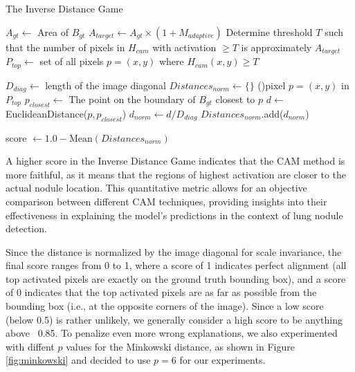 \begin{algorithm}[H]
    \caption{The Inverse Distance Game}
    \label{alg:distance-game}
    \DontPrintSemicolon
    \SetAlgoLined

    
    \BlankLine
    
    $A_{gt} \gets$ Area of $B_{gt}$\;
    $A_{target} \gets A_{gt} \times (1 + M_{adaptive})$\;
    Determine threshold $T$ such that the number of pixels in $H_{cam}$ with activation $\ge T$ is approximately $A_{target}$\;
    $P_{top} \gets$ set of all pixels $p=(x, y)$ where $H_{cam}(x, y) \ge T$\;

    \BlankLine

    $D_{diag} \gets$ length of the image diagonal\;
    $Distances_{norm} \gets \{\}$\;
    \ForAll(){pixel $p=(x, y)$ \textup{in} $P_{top}$}{
        $p_{closest} \gets$ The point on the boundary of $B_{gt}$ closest to $p$\;
        $d \gets$ EuclideanDistance($p, p_{closest}$)\;
        $d_{norm} \gets d / D_{diag}$\;
        $Distances_{norm}$.add($d_{norm}$)\;
    }

    \BlankLine
    score $\gets 1.0 - \text{Mean}(Distances_{norm})$\;
    \;
\end{algorithm}

A higher score in the Inverse Distance Game indicates that the CAM method is more faithful, as it means that the regions of highest activation are closer to the actual nodule location. This quantitative metric allows for an objective comparison between different CAM techniques, providing insights into their effectiveness in explaining the model's predictions in the context of lung nodule detection.

Since the distance is normalized by the image diagonal for scale invariance, the final score ranges from 0 to 1, where a score of 1 indicates perfect alignment (all top activated pixels are exactly on the ground truth bounding box), and a score of 0 indicates that the top activated pixels are as far as possible from the bounding box (i.e., at the opposite corners of the image).
Since a low score (below 0.5) is rather unlikely, we generally consider a high score to be anything above ~0.85. To penalize even more wrong explanations, we also experimented with diffent $p$ values for the Minkowski distance, as shown in Figure \ref{fig:minkowski} and decided to use $p=6$ for our experiments.





